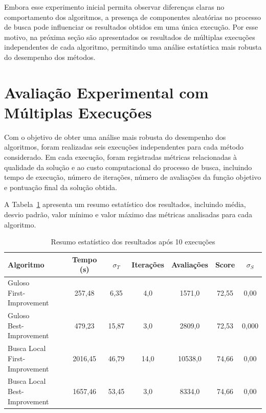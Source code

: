 Embora esse experimento inicial permita observar diferenças claras no comportamento 
dos algoritmos, a presença de componentes aleatórias no processo de busca 
pode influenciar os resultados obtidos em uma única execução. Por esse motivo, na 
próxima seção são apresentados os resultados de múltiplas execuções 
independentes de cada algoritmo, permitindo uma análise estatística mais robusta do 
desempenho dos métodos.

\section{Avaliação Experimental com Múltiplas Execuções}

Com o objetivo de obter uma análise mais robusta do desempenho dos algoritmos, foram 
realizadas seis execuções independentes para cada método considerado. 
Em cada execução, foram registradas métricas relacionadas à qualidade da solução e ao 
custo computacional do processo de busca, incluindo tempo de execução, 
número de iterações, número de avaliações da função objetivo e pontuação final da 
solução obtida.

A Tabela~\ref{tab:benchmark_multiplas_execucoes} apresenta um resumo estatístico dos resultados, incluindo média, desvio padrão, valor mínimo e 
valor máximo das métricas analisadas para cada algoritmo.

\begin{table}[H]
\centering
\caption{Resumo estatístico dos resultados após 10 execuções}
\label{tab:benchmark_multiplas_execucoes}
\begin{tabular}{lcccccc}
\toprule
Algoritmo & Tempo (s) & $\sigma_T$ & Iterações & Avaliações & Score & $\sigma_S$ \\
\midrule
\makecell[l]{Guloso \\ First-Improvement} & 257,48 & 6,35 & 4,0 & 1571,0 & 72,55 & 0,00 \\[4pt]
\makecell[l]{Guloso \\ Best-Improvement} & 479,23 & 15,87 & 3,0 & 2809,0 & 72,53 & 0,000 \\[10pt]
\makecell[l]{Busca Local \\ First-Improvement} & 2016,45 & 46,79 & 14,0 & 10538,0 & 74,66 & 0,00 \\[4pt]
\makecell[l]{Busca Local \\ Best-Improvement} & 1657,46 & 53,45 & 3,0 & 8334,0 & 74,66 & 0,00 \\
\bottomrule
\end{tabular}
\end{table}

